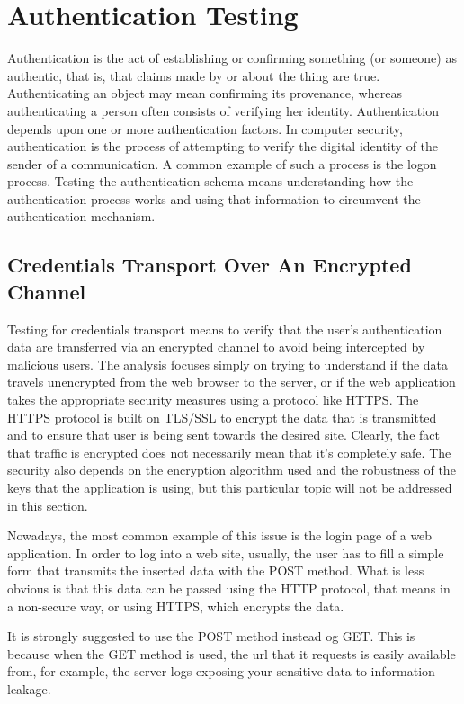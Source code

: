 \chapter{Authentication Testing}

	Authentication is the act of establishing or confirming something (or someone) as authentic, 
	that is, that claims made by or about the thing are true. Authenticating an object may
	mean confirming its provenance, whereas authenticating a person often consists of verifying her 
	identity. Authentication depends upon one or more authentication factors. In computer security,
	authentication is the process of attempting to verify the digital identity of the sender of a
	communication. A common example of such a process is the logon process. Testing the authentication 
	schema means understanding how the authentication process works and using that information to 
	circumvent the authentication mechanism.

\clearpage

\section{Credentials Transport Over An Encrypted Channel}
	Testing for credentials transport means to verify that the user's authentication data are transferred 
	via an encrypted channel to avoid being intercepted by malicious users. The analysis focuses simply 
	on trying to understand if the data travels unencrypted from the web browser to the server, or if the 
	web application takes the appropriate security measures using a protocol like HTTPS. The HTTPS protocol 
	is built on TLS/SSL to encrypt the data that is transmitted and to ensure that user is being sent towards
	the desired site. Clearly, the fact that traffic is encrypted does not necessarily mean that it's
	completely safe. The security also depends on the encryption algorithm used and the robustness of the 
	keys that the application is using, but this particular topic will not be addressed in this section. 

	Nowadays, the most common example of this issue is the login page of a web application. In order to 
	log into a web site, usually, the user has to fill a simple form that transmits the inserted data with 
	the POST method. What is less obvious is that this data can be passed using the HTTP protocol, that 
	means in a non-secure way, or using HTTPS, which encrypts the data.

	It is strongly suggested to use the POST method instead og GET. This is because when the GET method 
	is used, the url that it requests is easily available from, for example, the server logs exposing 
	your sensitive data to information leakage.

